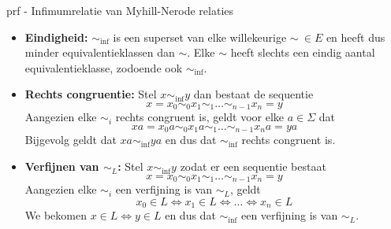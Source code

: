 \begin{prf}{prf - Infimumrelatie van Myhill-Nerode relaties}


    \begin{itemize}
        \item 
            \textbf{Eindigheid:} $\sim_{\text{inf}}$ is een superset van elke willekeurige $\sim \ \in E$ en heeft dus minder equivalentieklassen
            dan $\sim$. Elke $\sim$ heeft slechts een eindig aantal equivalentieklasse, zodoende ook $\sim_{\text{inf}}$.
        \item 
            \textbf{Rechts congruentie:} Stel $x \sim_{\text{inf}} y$ dan bestaat de sequentie 
            \begin{equation*}
                x = x_0 \sim_0 x_1 \sim_1 \ldots \sim_{n-1} x_n = y
            \end{equation*}
            Aangezien elke $\sim_i$ rechts congruent is, geldt voor elke $a \in \Sigma$ dat 
            \begin{equation*}
                xa = x_0a \sim_0 x_1a \sim_1 \ldots \sim_{n-1} x_na = ya
            \end{equation*}
            Bijgevolg geldt dat $xa \sim_{\text{inf}} ya$ en dus dat $\sim_{\text{inf}}$ rechts congruent is.
        \item 
            \textbf{Verfijnen van $\sim_L$:} Stel $x \sim_{\text{inf}} y$ zodat er een sequentie bestaat 
            \begin{equation*}
                x = x_0 \sim_0 x_1 \sim_1 \ldots \sim_{n-1} x_n = y
            \end{equation*}
            Aangezien elke $\sim_i$ een verfijning is van $\sim_L$, geldt
            \begin{equation*}
                x_0 \in L \Leftrightarrow x_1 \in L \Leftrightarrow \ldots \Leftrightarrow x_n \in L
            \end{equation*}
            We bekomen $x \in L \Leftrightarrow y \in L$ en dus dat $\sim_{\text{inf}}$ een verfijning is van $\sim_L$.
    \end{itemize}

    \vspace{-0.3cm}
\end{prf}

